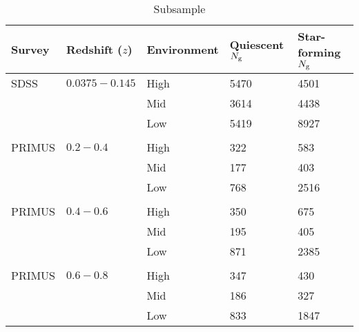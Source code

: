 \documentclass{emulateapj}
\begin{document}
\begin{table*} %
  \caption{Subsample}
  \label{tab:subsample}
  \begin{center}
    \leavevmode
    \begin{tabular}{lllll} \hline \hline              
  Survey    &Redshift ($z$) &Environment    &Quiescent $N_{\rm{g}}$ &Star-forming $N_{\rm{g}}$  \\ \hline 
  SDSS      &$0.0375-0.145$ &High           &5470                       &4501                           \\
            &               &Mid            &3614                       &4438                           \\
            &               &Low            &5419                       &8927                           \\
            &               &               &                       &                           \\ \hline
  PRIMUS    &$0.2-0.4$      &High           &322                    &583                           \\
            &               &Mid            &177                    &403                          \\
            &               &Low            &768                    &2516                           \\
            &               &               &                       &                           \\ \hline
  PRIMUS    &$0.4-0.6$      &High           &350                       &675                           \\
            &               &Mid            &195                       &405                           \\
            &               &Low            &871                       &2385                           \\
            &               &               &                       &                           \\ \hline
  PRIMUS    &$0.6-0.8$      &High           &347                       &430                           \\
            &               &Mid            &186                       &327                           \\
            &               &Low            &833                       &1847                           \\

\end{tabular}
\end{center}
\end{table*}
\end{document}

